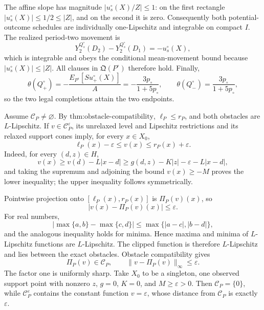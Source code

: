 The affine slope has magnitude \(|u_s^{\circ}(X)/Z|\leq1\): on the first rectangle \(|u_s^{\circ}(X)|\leq1/2\leq|Z|\), and on the second it is zero.  Consequently both potential-outcome schedules are individually one-Lipschitz and integrable on compact \(I\).  The realized period-two movement is
\[
 Y_2^{Q_s^{\circ}}(D_2)-Y_2^{Q_s^{\circ}}(D_1)=-u_s^{\circ}(X),
\]
which is integrable and obeys the conditional mean-movement bound because \(|u_s^{\circ}(X)|\leq|Z|\).  All clauses in \(\mathfrak Q(P^{\circ})\) therefore hold.  Finally,
\[
 \theta(Q_+^{\circ})
 =-\frac{E_{P^{\circ}}[Su_+^{\circ}(X)]}{A}
 =-\frac{3p_{\circ}}{1+5p_{\circ}},
 \qquad
 \theta(Q_-^{\circ})
 =\frac{3p_{\circ}}{1+5p_{\circ}},
\]
so the two legal completions attain the two endpoints.

Assume \(\mathcal C_P\neq\varnothing\).  By \(\text{thm:obstacle-compatibility}\), \(\ell_P\leq r_P\), and both obstacles are \(L\)-Lipschitz.  If \(v\in\mathcal C_P^{\varepsilon}\), its unrelaxed level and Lipschitz restrictions and its relaxed support cones imply, for every \(x\in X_0\),
\[
 \ell_P(x)-\varepsilon\leq v(x)\leq r_P(x)+\varepsilon.
\]
Indeed, for every \((d,z)\in H\),
\[
 v(x)\geq v(d)-L|x-d|
 \geq g(d,z)-K|z|-\varepsilon-L|x-d|,
\]
and taking the supremum and adjoining the bound \(v(x)\geq-M\) proves the lower inequality; the upper inequality follows symmetrically.

Pointwise projection onto \([\ell_P(x),r_P(x)]\) is \(\Pi_P(v)(x)\), so
\[
 |v(x)-\Pi_P(v)(x)|\leq\varepsilon.
\]
For real numbers,
\[
 |\max\{a,b\}-\max\{c,d\}|\leq\max\{|a-c|,|b-d|\},
\]
and the analogous inequality holds for minima.  Hence maxima and minima of \(L\)-Lipschitz functions are \(L\)-Lipschitz.  The clipped function is therefore \(L\)-Lipschitz and lies between the exact obstacles.  Obstacle compatibility gives
\[
 \Pi_P(v)\in\mathcal C_P,
 \qquad
 \|v-\Pi_P(v)\|_\infty\leq\varepsilon.
\]
The factor one is uniformly sharp.  Take \(X_0\) to be a singleton, one observed support point with nonzero \(z\), \(g=0\), \(K=0\), and \(M\geq\varepsilon>0\).  Then \(\mathcal C_P=\{0\}\), while \(\mathcal C_P^{\varepsilon}\) contains the constant function \(v=\varepsilon\), whose distance from \(\mathcal C_P\) is exactly \(\varepsilon\).

